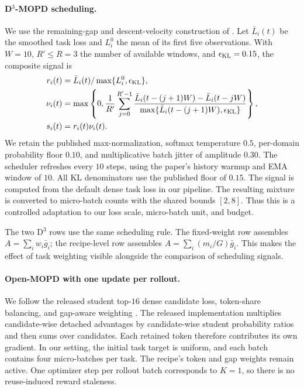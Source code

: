 \paragraph{D$^3$-MOPD scheduling.}
We use the remaining-gap and descent-velocity construction of
\citet{sun2026d3mopd}. Let $\bar L_i(t)$ be the smoothed task loss
and $L_i^0$ the mean of its first five observations. With $W=10$,
$R'\leq R=3$ the number of available windows, and
$\epsilon_{\rm KL}=0.15$, the composite signal is
\begin{equation}
\begin{split}
    r_i(t)&=\bar L_i(t)/\max\{L_i^0,\epsilon_{\rm KL}\},\\
    \nu_i(t)&=\max\left\{0,\frac1{R'}
       \sum_{j=0}^{R'-1}
       \frac{\bar L_i(t-(j+1)W)-\bar L_i(t-jW)}
            {\max\{\bar L_i(t-(j+1)W),\epsilon_{\rm KL}\}}\right\},\\
    s_i(t)&=r_i(t)\nu_i(t).
\end{split}
\end{equation}
We retain the published max-normalization, softmax temperature $0.5$,
per-domain probability floor $0.10$, and multiplicative batch jitter
of amplitude $0.30$. The scheduler refreshes every $10$ steps,
using the paper's history warmup and EMA window of $10$.
All KL denominators use the published floor of $0.15$.
The signal is computed from the default dense task loss in our pipeline.
The resulting mixture is converted to micro-batch counts with the
shared bounds $[2,8]$. Thus this is a controlled adaptation to our loss
scale, micro-batch unit, and budget.

The two D$^3$ rows use the same scheduling rule. The fixed-weight
row assembles $A=\sum_iw_i\bar g_i$; the recipe-level row assembles
$A=\sum_i(m_i/G)\bar g_i$. This makes the effect of task weighting
visible alongside the comparison of scheduling signals.

\paragraph{Open-MOPD with one update per rollout.}
We follow the released student top-$16$ dense candidate loss,
token-share balancing, and gap-aware weighting
\citep{gao2026openmopddiagnosingfixingcapability,openmopd2026code}.
The released implementation multiplies candidate-wise detached
advantages by candidate-wise student probability ratios and then
sums over candidates. Each retained token therefore contributes its own gradient. In our setting, the initial task target is uniform, and each
batch contains four micro-batches per task. The recipe's token and
gap weights remain active. One optimizer step per rollout batch
corresponds to $K=1$, so there is no reuse-induced reward staleness.

